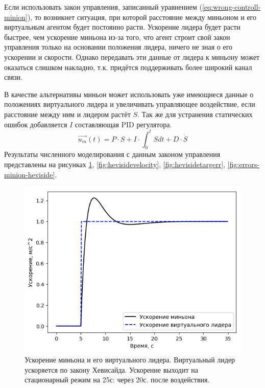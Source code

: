 \documentclass[a4paper, 14pt]{extarticle}
\begin{document}
Если использовать закон управления, записанный уравнением (\ref{eq:wrong-controll-minion}), то возникнет ситуация, при которой расстояние между миньоном и его виртуальным агентом будет постоянно расти. Ускорение лидера будет расти быстрее, чем ускорение миньона из-за того, что агент строит свой закон управления только на основании положения лидера, ничего не зная о его ускорении и скорости. Однако передавать эти данные от лидера к миньону может оказаться слишком накладно, т.к. придётся поддерживать более широкий канал связи.
\par
В качестве альтернативы миньон может использовать уже имеющиеся данные о положениях виртуального лидера и увеличивать управляющее воздействие, если расстояние между ним и лидером растёт $\dot{S}$. Так же для устранения статических ошибок добавляется $I$ составляющая PID регулятора.
\begin{equation} \label{eq:right-controll-minion}
\vec{u_{m}}(t) = P \cdot S  + I \cdot \int_0^t{S}dt + D \cdot \dot{S}
\end{equation}
Результаты численного моделирования с данным законом управления представлены на рисунках \ref{fig:hevisideaccelerations}, \ref{fig:hevisidevelocity}, \ref{fig:hevisidetargerr}, \ref{fig:errors-minion-heviside}.
\begin{figure}[!htbp]
	\centering
	\includegraphics[width=0.6\linewidth]{minion/heviside_accelerations}
	\caption{Ускорение миньона и его виртуального лидера. Виртуальный лидер ускоряется по закону Хевисайда. Ускорение выходит на стационарный режим на 25с: через 20с. после воздействия.}
	\label{fig:hevisideaccelerations}
\end{figure}
\end{document}
